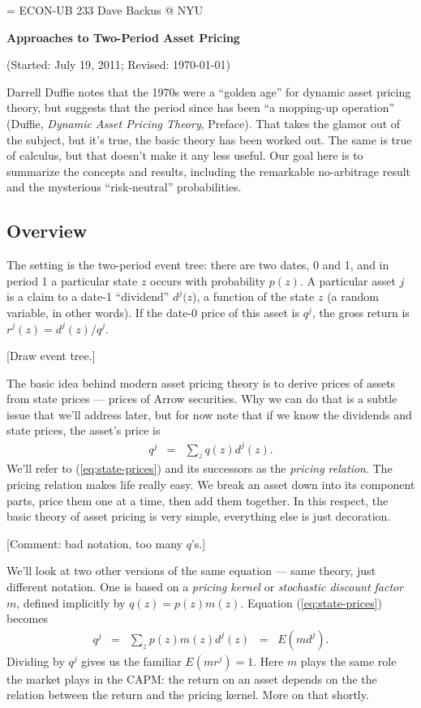 \documentclass[11pt]{article}
\begin{document}
\parskip=\bigskipamount
\parindent=0.0in
\thispagestyle{empty}
{\large ECON-UB 233 \hfill Dave Backus @ NYU}

\bigskip\bigskip
\centerline{\Large \bf Approaches to Two-Period Asset Pricing}
\centerline{(Started: July 19, 2011; Revised: \today)}

\bigskip
Darrell Duffie notes that the 1970s were a ``golden age''
for dynamic asset pricing theory,
but suggests that the period since has been ``a mopping-up operation''
(Duffie, {\it Dynamic Asset Pricing Theory\/}, Preface).
That takes the glamor out of the subject,
but it's true, the basic theory has been worked out.
The same is true of calculus, but that doesn't make it any less useful.
Our goal here is to summarize the concepts and results,
including the remarkable no-arbitrage result and
the mysterious ``risk-neutral'' probabilities.


\subsection*{Overview}

The setting is the two-period event tree:
there are two dates, 0 and 1,
and in period 1 a particular state $z$ occurs with probability $p(z)$.
A particular asset $j$ is a claim to a date-1 ``dividend'' $d^j(z$),
a function of the state  $z$ (a random variable, in other words).
If the date-0 price of this asset is $q^j$,
the gross return is $r^j(z) = d^j(z) / q^j$.

[Draw event tree.]

The basic idea behind modern asset pricing theory is to
derive prices of assets from state prices --- prices of Arrow securities.
Why we can do that is a subtle issue that we'll address later,
but for now note that if we know the dividends and state prices,
the asset's price is
\begin{eqnarray}
    q^j   &=& \sum_z q(z) d^j(z) .
    \label{eq:state-prices}
\end{eqnarray}
We'll refer to (\ref{eq:state-prices}) and its successors
as the {\it pricing relation\/}.
The pricing relation makes life really easy.
We break an asset down into its component parts,
price them one at a time, then add them together.
In this respect, the basic theory of asset pricing is very simple,
everything else is just decoration.

[Comment:  bad notation, too many $q$'s.]

We'll look at two other versions of the same equation ---
same theory, just different notation.
One is based on a {\it pricing kernel\/}
or {\it stochastic discount factor\/} $m$,
defined implicitly  by $ q(z) = p(z) m(z) $.
Equation (\ref{eq:state-prices}) becomes
\begin{eqnarray}
    q^j   &=& \sum_z p(z) m(z) d^j(z)  \;\;=\;\; E (m d^j) .
    \label{eq:pricing-kernel}
\end{eqnarray}
Dividing by $q^j$ gives us the familiar $E(mr^j) = 1$.
Here $m$ plays the same role the market plays in the CAPM:
the return on an asset depends on the the relation between the return and the pricing kernel.
More on that shortly.
\end{document}
